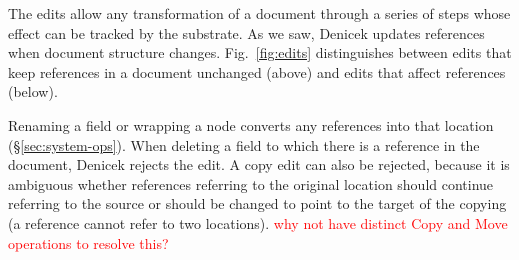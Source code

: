\documentclass[sigconf,anonymous,screen]{acmart}
\newcommand{\note}[1]{\textcolor{red}{#1}}
\begin{document}
The edits allow any transformation of a document through a series of steps whose effect can be
tracked by the substrate. As we saw, Denicek updates references when document structure changes.
Fig.~\ref{fig:edits} distinguishes between edits that keep references in a document unchanged
(above) and edits that affect references (below).

Renaming a field or wrapping a node converts any references into that location
(\S\ref{sec:system-ops}). When deleting a field to which there is a reference in the document, Denicek
rejects the edit. A copy edit can also be rejected, because it is ambiguous whether references
referring to the original location should continue referring to the source or should be changed to
point to the target of the copying (a reference cannot refer to two locations).
\note{why not have distinct Copy and Move operations to resolve this?}

\end{document}
